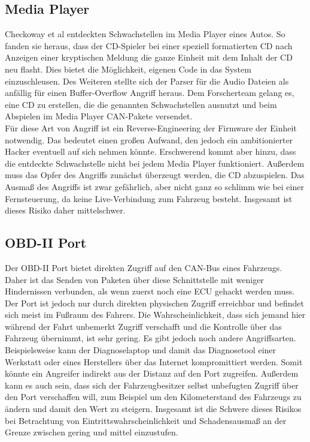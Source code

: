 \subsection{Media Player}
Checkoway et al entdeckten Schwachstellen im Media Player eines Autos. So fanden sie heraus, dass der CD-Spieler bei einer speziell formatierten CD nach Anzeigen einer kryptischen Meldung die ganze Einheit mit dem Inhalt der CD neu flasht. Dies bietet die Möglichkeit, eigenen Code in das System einzuschleusen. Des Weiteren stellte sich der Parser für die Audio Dateien als anfällig für einen Buffer-Overflow Angriff heraus. Dem Forscherteam gelang es, eine CD zu erstellen, die die genannten Schwachstellen ausnutzt und beim Abspielen im Media Player \acs{CAN}-Pakete versendet. \cite[7]{Checkoway.2011} \\
Für diese Art von Angriff ist ein Reverse-Engineering der Firmware der Einheit notwendig. Das bedeutet einen großen Aufwand, den jedoch ein ambitionierter Hacker eventuell auf sich nehmen könnte. Erschwerend kommt aber hinzu, dass die entdeckte Schwachstelle nicht bei jedem Media Player funktioniert. Außerdem muss das Opfer des Angriffs zunächst überzeugt werden, die CD abzuspielen. Das Ausmaß des Angriffs ist zwar gefährlich, aber nicht ganz so schlimm wie bei einer Fernsteuerung, da keine Live-Verbindung zum Fahrzeug besteht. Insgesamt ist dieses Risiko daher mittelschwer.

\subsection{OBD-II Port}
Der OBD-II Port bietet direkten Zugriff auf den \acs{CAN}-Bus eines Fahrzeugs. Daher ist das Senden von Paketen über diese Schnittstelle mit weniger Hindernissen verbunden, als wenn zuerst noch eine \acs{ECU} gehackt werden muss. Der Port ist jedoch nur durch direkten physischen Zugriff erreichbar und befindet sich meist im Fußraum des Fahrers. Die Wahrscheinlichkeit, dass sich jemand hier während der Fahrt unbemerkt Zugriff verschafft und die Kontrolle über das Fahrzeug übernimmt, ist sehr gering. Es gibt jedoch noch andere Angriffsarten. Beispielsweise kann der Diagnoselaptop und damit das Diagnosetool einer Werkstatt oder eines Herstellers über das Internet kompromittiert werden. Somit könnte ein Angreifer indirekt aus der Distanz auf den Port zugreifen. Außerdem kann es auch sein, dass sich der Fahrzeugbesitzer selbst unbefugten Zugriff über den Port verschaffen will, zum Beispiel um den Kilometerstand des Fahrzeugs zu ändern und damit den Wert zu steigern. Insgesamt ist die Schwere dieses Risikos bei Betrachtung von Eintrittswahrscheinlichkeit und Schadensausmaß an der Grenze zwischen gering und mittel einzustufen.

